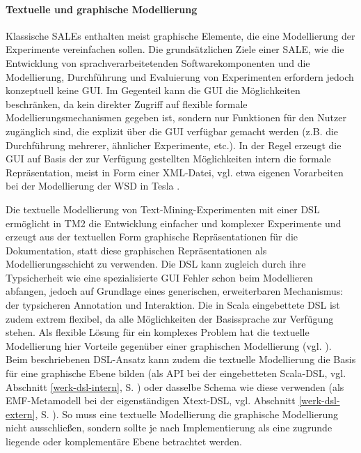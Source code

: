 \documentclass[abstracton, 12pt]{scrartcl}
\begin{document}
\paragraph{Textuelle und graphische Modellierung}

Klassische SALEs enthalten meist graphische Elemente, die eine Modellierung der Experimente vereinfachen sollen. Die grundsätzlichen Ziele einer SALE, wie die Entwicklung von sprachverarbeitetenden Softwarekomponenten und die Modellierung, Durchführung und Evaluierung von Experimenten erfordern jedoch konzeptuell keine GUI. Im Gegenteil kann die GUI die Möglichkeiten beschränken, da kein direkter Zugriff auf flexible formale Modellierungsmechanismen gegeben ist, sondern nur Funktionen für den Nutzer zugänglich sind, die explizit über die GUI verfügbar gemacht werden (z.B. die Durchführung mehrerer, ähnlicher Experimente, etc.). In der Regel erzeugt die GUI auf Basis der zur Verfügung gestellten Möglichkeiten intern die formale Repräsentation, meist in Form einer XML-Datei, vgl. etwa eigenen Vorarbeiten bei der Modellierung der WSD in Tesla \citep[V]{Steeg2007}.

Die textuelle Modellierung von Text-Mining-Experimenten mit einer DSL ermöglicht in TM2 die Entwicklung einfacher und komplexer Experimente und erzeugt aus der textuellen Form graphische Repräsentationen für die Dokumentation, statt diese graphischen Repräsentationen als Modellierungsschicht zu verwenden. Die DSL kann zugleich durch ihre Typsicherheit wie eine spezialisierte GUI Fehler schon beim Modellieren abfangen, jedoch auf Grundlage eines generischen, erweiterbaren Mechanismus: der typsicheren Annotation und Interaktion. Die in Scala eingebettete DSL ist zudem extrem flexibel, da alle Möglichkeiten der Basissprache zur Verfügung stehen. Als flexible Lösung für ein komplexes Problem hat die textuelle Modellierung hier Vorteile gegenüber einer graphischen Modellierung (vgl. \citealt{GreenAndPetre1992}). Beim beschriebenen DSL-Ansatz kann zudem die textuelle Modellierung die Basis für eine graphische Ebene bilden (als API bei der eingebetteten Scala-DSL, vgl. Abschnitt \ref{werk-dsl-intern}, S. \pageref{werk-dsl-intern}) oder dasselbe Schema wie diese verwenden (als EMF-Metamodell bei der eigenständigen Xtext-DSL, vgl. Abschnitt \ref{werk-dsl-extern}, S. \pageref{werk-dsl-extern}). So muss eine textuelle Modellierung die graphische Modellierung nicht ausschließen, sondern sollte je nach Implementierung als eine zugrunde liegende oder komplementäre Ebene betrachtet werden.
\end{document}
